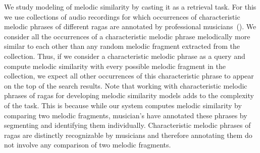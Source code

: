

We study modeling of melodic similarity by casting it as a retrieval task. For this we use collections of audio recordings for which occurrences of characteristic melodic phrases of different \glspl{raga} are annotated by professional musicians~(). We consider all the occurrences of a characteristic melodic phrase melodically more similar to each other than any random melodic fragment extracted from the collection. Thus, if we consider a characteristic melodic phrase as a query and compute melodic similarity with every possible melodic fragment in the collection, we expect all other occurrences of this characteristic phrase to appear on the top of the search results. Note that working with characteristic melodic phrases of \glspl{raga} for developing melodic similarity models adds to the complexity of the task. This is because while our system computes melodic similarity by comparing two melodic fragments, musician's have annotated these phrases by segmenting and identifying them individually. Characteristic melodic phrases of \glspl{raga} are distinctly recognizable by musicians and therefore annotating them do not involve any comparison of two melodic fragments. 

